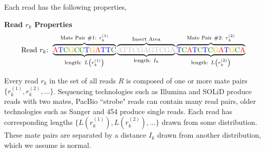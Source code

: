 \documentclass[phd,tocprelim]{cornell}
\begin{document}
\pagebreak

Each read has the following properties,
\begin{center}
\textbf{Read $r_{k}$ Properties}
\[\text{Read $r_{k}$: }\overbrace{\underbrace{\text{{\color{red} A}{\color{blue} T}{\color{MyDarkGreen} C}{\color{orange} G}{\color{MyDarkGreen} C}{\color{MyDarkGreen} C}{\color{blue} T}{\color{orange} G}{\color{red} A}{\color{blue} T}{\color{blue} T}{\color{MyDarkGreen} C}}}_{\text{length: } L\left(r_{k}^{(1)}\right) }}^{\text{Mate Pair \#1: } r_{k}^{(1)}}
\overbrace{\underbrace{\text{{\color{gray} ATTCGAGTCGA}}}_{\text{length: } I_{k} }}^{\text{Insert Area}}
\overbrace{\underbrace{\text{{\color{blue} T}{\color{MyDarkGreen} C}{\color{red} A}{\color{blue} T}{\color{MyDarkGreen} C}{\color{blue} T}{\color{MyDarkGreen} C}{\color{orange} G}{\color{red} A}{\color{blue} T}{\color{orange} G}{\color{MyDarkGreen} C}{\color{red} A}}}_{\text{length: } L\left(r_{k}^{(2)}\right) }}^{\text{Mate Pair \#2: } r_{k}^{(2)}}\]
\end{center}
Every read $r_{k}$ in the set of all reads $R$ is composed of one or more mate pairs $\{r_{k}^{(1)}, r_{k}^{(2)}, \ldots\}$. Sequencing technologies such as Illumina and SOLiD produce reads with two mates, PacBio ``strobe" reads can contain many read pairs, older technologies such as Sanger and 454 produce single reads. Each read has corresponding lengths $\{L\left(r_{k}^{(1)}\right), L\left(r_{k}^{(2)}\right), \ldots\}$ drawn from some distribution. These mate pairs are separated by a distance $I_{k}$ drawn from another distribution, which we assume is normal.

\pagebreak
\end{document}
